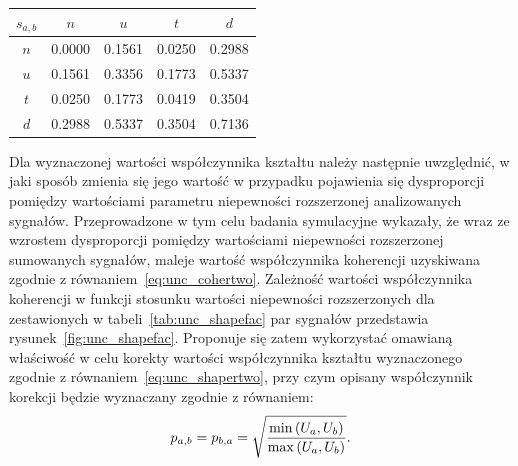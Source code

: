 \begin{table}[htb!]
\begin{center}
\begin{tabular}[c]{| c *{4}{|S[table-format = 1.4]} |} \hline
$s_{a,b}$ & \textbf{$n$} & \textbf{$u$} & \textbf{$t$} & \textbf{$d$} \\ \hline
$n$       & 0.0000       & 0.1561       & 0.0250       & 0.2988       \\ \hline
$u$       & 0.1561       & 0.3356       & 0.1773       & 0.5337       \\ \hline
$t$       & 0.0250       & 0.1773       & 0.0419       & 0.3504       \\ \hline
$d$       & 0.2988       & 0.5337       & 0.3504       & 0.7136       \\ \hline
\end{tabular}
\end{center}
\end{table}

Dla wyznaczonej wartości współczynnika kształtu należy następnie uwzględnić, w jaki sposób zmienia się jego wartość w przypadku pojawienia się dysproporcji pomiędzy wartościami parametru niepewności rozszerzonej analizowanych sygnałów. Przeprowadzone w tym celu badania symulacyjne wykazały, że wraz ze wzrostem dysproporcji pomiędzy wartościami niepewności rozszerzonej sumowanych sygnałów, maleje wartość współczynnika koherencji uzyskiwana zgodnie z równaniem~\eqref{eq:unc_cohertwo}. Zależność wartości współczynnika koherencji w funkcji stosunku wartości niepewności rozszerzonych dla zestawionych w tabeli~\ref{tab:unc_shapefac} par sygnałów przedstawia rysunek~\ref{fig:unc_shapefac}. Proponuje się zatem wykorzystać omawianą właściwość w celu korekty wartości współczynnika kształtu wyznaczonego zgodnie z równaniem~\eqref{eq:unc_shapertwo}, przy czym opisany współczynnik korekcji będzie wyznaczany zgodnie z równaniem:
\begin{equation}
p_{a,b} = p_{b,a} = \sqrt{\frac{\min \left(U_{a}, U_{b}\right)}{\max \left(U_{a}, U_{b}\right)}} \label{eq:unc_cohercorra}.
\end{equation}

